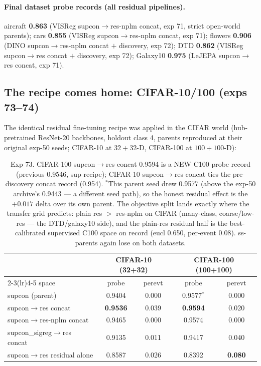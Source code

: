 \documentclass[11pt]{article}
\newcommand{\best}[1]{\textbf{#1}}
\begin{document}
\paragraph{Final dataset probe records (all residual pipelines).}
aircraft \best{0.863} (VISReg supcon$\to$res-nplm concat, exp 71,
strict open-world parents);
cars \best{0.855} (VISReg supcon$\to$res-nplm concat, exp 71);
flowers \best{0.906} (DINO supcon$\to$res-nplm concat $+$ discovery,
exp 72); DTD \best{0.862} (VISReg supcon$\to$res concat $+$ discovery,
exp 72); Galaxy10 \best{0.975} (LeJEPA supcon$\to$res concat, exp 71).

\subsection{The recipe comes home: CIFAR-10/100 (exps 73--74)}

The identical residual fine-tuning recipe was applied in the CIFAR
world (hub-pretrained ResNet-20 backbones, holdout class 4, parents
reproduced at their original exp-50 seeds; CIFAR-10 at $32{+}32$-D,
CIFAR-100 at $100{+}100$-D):

\begin{table}[h]\centering\small
\setlength{\tabcolsep}{5pt}
\begin{tabular}{l cc cc}
\toprule
& \multicolumn{2}{c}{CIFAR-10 (32+32)} & \multicolumn{2}{c}{CIFAR-100 (100+100)} \\
\cmidrule(lr){2-3}\cmidrule(lr){4-5}
space & probe & perevt & probe & perevt \\
\midrule
supcon (parent) & 0.9404 & 0.000 & 0.9577$^\ast$ & 0.000 \\
supcon$\to$res concat & \best{0.9536} & 0.039 & \best{0.9594} & 0.020 \\
supcon$\to$res-nplm concat & 0.9465 & 0.000 & 0.9574 & 0.000 \\
supcon\_sigreg$\to$res concat & 0.9135 & 0.011 & 0.9417 & 0.040 \\
supcon$\to$res residual alone & 0.8587 & 0.026 & 0.8392 & \best{0.080} \\
\bottomrule
\end{tabular}
\caption{Exp 73.  CIFAR-100 supcon$\to$res concat 0.9594 is a NEW C100
probe record (previous 0.9546, sup recipe); CIFAR-10 supcon$\to$res
concat ties the pre-discovery concat record (0.954).  $^\ast$This
parent seed drew 0.9577 (above the exp-50 archive's 0.9443 --- a
different seed path), so the honest residual effect is the $+0.017$
delta over its own parent.  The objective split lands exactly where the
transfer grid predicts: plain res $>$ res-nplm on CIFAR (many-class,
coarse/low-res --- the DTD/galaxy10 side), and the plain-res residual
half is the best-calibrated supervised C100 space on record (eucl
0.650, per-event 0.08).  ss-parents again lose on both datasets.}
\end{table}
\end{document}
